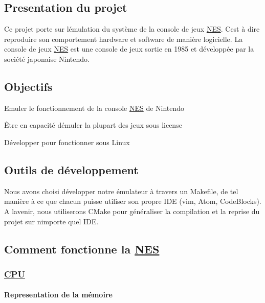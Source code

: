 \subsection*{Presentation du projet}

Ce projet porte sur l\textquotesingle{}émulation du système de la console de jeux \hyperlink{struct_n_e_s}{N\+ES}. C\textquotesingle{}est à dire reproduire son comportement hardware et software de manière logicielle. La console de jeux \hyperlink{struct_n_e_s}{N\+ES} est une console de jeux sortie en 1985 et développée par la société japonaise Nintendo.

\subsection*{Objectifs}


\begin{DoxyItemize}
\item Emuler le fonctionnement de la console \hyperlink{struct_n_e_s}{N\+ES} de Nintendo
\item Être en capacité d\textquotesingle{}émuler la plupart des jeux sous license
\item Développer pour fonctionner sous Linux
\end{DoxyItemize}

\subsection*{Outils de développement}

Nous avons choisi développer notre émulateur à travers un Makefile, de tel manière à ce que chacun puisse utiliser son propre I\+DE (vim, Atom, Code\+Blocks). A l\textquotesingle{}avenir, nous utiliserons C\+Make pour généraliser la compilation et la reprise du projet sur n\textquotesingle{}importe quel I\+DE.

\subsection*{Comment fonctionne la \hyperlink{struct_n_e_s}{N\+ES}}

\subsubsection*{\hyperlink{struct_c_p_u}{C\+PU}}

\paragraph*{Representation de la mémoire}



